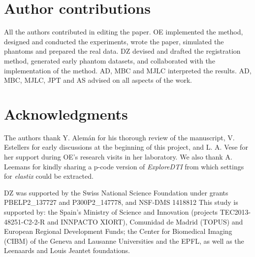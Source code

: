 \section*{Author contributions}
All the authors contributed in editing the paper.
OE implemented the method, designed and conducted the experiments, wrote the paper,
  simulated the phantoms and prepared the real data.
DZ devised and drafted the registration method, generated early phantom datasets, and
  collaborated with the implementation of the method.
AD, MBC and MJLC interpreted the results.
AD, MBC, MJLC, JPT and AS advised on all aspects of the work.

\section*{Acknowledgments}
The authors thank Y. Alem\'an for his thorough review of the manuscript,
  V. Estellers for early discussions at the beginning of this project,
  and L. A. Vese for her support during OE's research visits in her laboratory.
We also thank A. Leemans for kindly sharing a p-code version of \emph{ExploreDTI} from
  which settings for \emph{elastix} could be extracted.

DZ was supported by the Swiss National Science Foundation under grants PBELP2\_137727 
  and P300P2\_147778, and NSF-DMS 1418812
This study is supported by: the Spain's Ministry of Science and Innovation
  (projects TEC2013-48251-C2-2-R and INNPACTO XIORT), Comunidad de Madrid (TOPUS) and
  European Regional Development Funds; the Center for Biomedical Imaging
  (CIBM) of the Geneva and Lausanne Universities and the EPFL, as well as the
  Leenaards and Louis Jeantet foundations.
